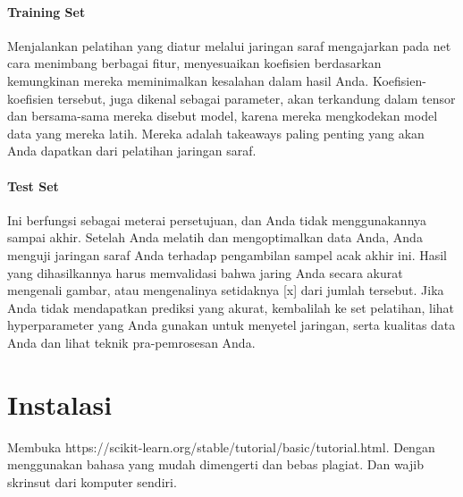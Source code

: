 \paragraph{Training Set} \hspace{0pt} \par
Menjalankan pelatihan yang diatur melalui jaringan saraf mengajarkan pada net cara menimbang berbagai fitur, menyesuaikan koefisien berdasarkan kemungkinan mereka meminimalkan kesalahan dalam hasil Anda.
Koefisien-koefisien tersebut, juga dikenal sebagai parameter, akan terkandung dalam tensor dan bersama-sama mereka disebut model, karena mereka mengkodekan model data yang mereka latih. Mereka adalah takeaways paling penting yang akan Anda dapatkan dari pelatihan jaringan saraf.

\paragraph{Test Set} \hspace{0pt} \par
Ini berfungsi sebagai meterai persetujuan, dan Anda tidak menggunakannya sampai akhir. Setelah Anda melatih dan mengoptimalkan data Anda, Anda menguji jaringan saraf Anda terhadap pengambilan sampel acak akhir ini. Hasil yang dihasilkannya harus memvalidasi bahwa jaring Anda secara akurat mengenali gambar, atau mengenalinya setidaknya [x] dari jumlah tersebut. Jika Anda tidak mendapatkan prediksi yang akurat, kembalilah ke set pelatihan, lihat hyperparameter yang Anda gunakan untuk menyetel jaringan, serta kualitas data Anda dan lihat teknik pra-pemrosesan Anda.


\section{Instalasi}
Membuka https://scikit-learn.org/stable/tutorial/basic/tutorial.html. Dengan menggunakan bahasa yang mudah dimengerti dan bebas plagiat.  Dan wajib skrinsut dari komputer sendiri.
